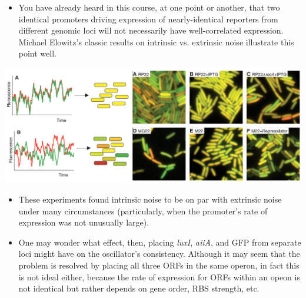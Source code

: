 \documentclass{article}
\begin{document}
\begin{itemize}
\item You have already heard in this course, at one point or another, that two identical promoters driving expression of nearly-identical reporters from different genomic loci will not necessarily have well-correlated expression. Michael Elowitz's classic results on intrinsic vs. extrinsic noise illustrate this point well.
\end{itemize}
\begin{center}
\includegraphics[width=\textwidth]{intrinsic_extrinsic.png}
\end{center}
\begin{itemize}
\item These experiments found intrinsic noise to be on par with extrinsic noise under many circumstances (particularly, when the promoter's rate of expression was not unusually large).
\item One may wonder what effect, then, placing \textit{luxI}, \textit{aiiA}, and GFP from separate loci might have on the oscillator's consistency. Although it may seem that the problem is resolved by placing all three ORFs in the same operon, in fact this is not ideal either, because the rate of expression for ORFs within an opeon is not identical but rather depends on gene order, RBS strength, etc.
\end{itemize}
\end{document}
